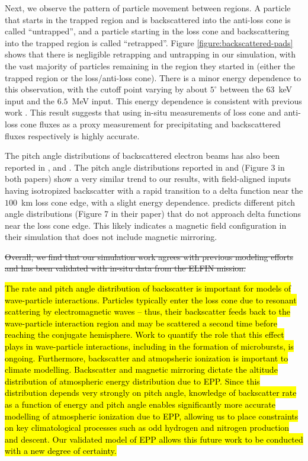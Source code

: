 \documentclass[draft]{agujournal2019}
\newcommand{\mathdeg}{^\circ}
\begin{document}
Next, we observe the pattern of particle movement between regions. A particle that starts in the trapped region and is backscattered into the anti-loss cone is called ``untrapped'', and a particle starting in the loss cone and backscattering into the trapped region is called ``retrapped''. Figure \ref{figure:backscattered-pads} shows that there is negligible retrapping and untrapping in our simulation, with the vast majority of particles remaining in the region they started in (either the trapped region or the loss/anti-loss cone). There is a minor energy dependence to this observation, with the cutoff point varying by about $5\mathdeg$ between the $63$~keV input and the $6.5$~MeV input. This energy dependence is consistent with previous work \cite{marshall2018}. This result suggests that using in-situ measurements of loss cone and anti-loss cone fluxes as a proxy measurement for precipitating and backscattered fluxes respectively is highly accurate.

The pitch angle distributions of backscattered electron beams has also been reported in , and . The pitch angle distributions reported in  and  (Figure 3 in both papers) show a very similar trend to our results, with field-aligned inputs having isotropized backscatter with a rapid transition to a delta function near the $100$~km loss cone edge, with a slight energy dependence.  predicts different pitch angle distributions (Figure 7 in their paper) that do not approach delta functions near the loss cone edge. This likely indicates a magnetic field configuration in their simulation that does not include magnetic mirroring.

\st{Overall, we find that our simulation work agrees with previous modeling efforts and has been validated with in-situ data from the ELFIN mission.}

\hl{The rate and pitch angle distribution of backscatter is important for models of wave-particle interactions. Particles typically enter the loss cone due to resonant scattering by electromagnetic waves -- thus, their backscatter feeds back to the wave-particle interaction region and may be scattered a second time before reaching the conjugate hemisphere. Work to quantify the role that this effect plays in wave-particle interactions, including in the formation of microbursts, is ongoing. Furthermore, backscatter and atmopsheric ionization is important to climate modelling. Backscatter and magnetic mirroring dictate the altitude distribution of atmospheric energy distribution due to EPP. Since this distribution depends very strongly on pitch angle, knowledge of backscatter rate as a function of energy and pitch angle enables significantly more accurate modelling of atmospheric ionization due to EPP, allowing us to place constraints on key climatological processes such as odd hydrogen and nitrogen production and descent. Our validated model of EPP allows this future work to be conducted with a new degree of certainty.}
\end{document}
